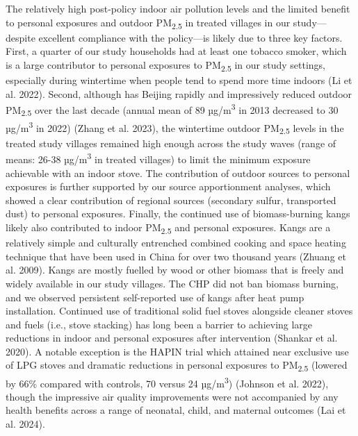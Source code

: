 \documentclass[
  letterpaper,
  DIV=11,
  numbers=noendperiod]{scrartcl}
\begin{document}
The relatively high post-policy indoor air pollution levels and the
limited benefit to personal exposures and outdoor PM\textsubscript{2.5}
in treated villages in our study---despite excellent compliance with the
policy---is likely due to three key factors. First, a quarter of our
study households had at least one tobacco smoker, which is a large
contributor to personal exposures to PM\textsubscript{2.5} in our study
settings, especially during wintertime when people tend to spend more
time indoors (Li et al. 2022). Second, although has Beijing rapidly and
impressively reduced outdoor PM\textsubscript{2.5} over the last decade
(annual mean of 89 µg/m\textsuperscript{3} in 2013 decreased to 30
µg/m\textsuperscript{3} in 2022) (Zhang et al. 2023), the wintertime
outdoor PM\textsubscript{2.5} levels in the treated study villages
remained high enough across the study waves (range of means: 26-38
µg/m\textsuperscript{3} in treated villages) to limit the minimum
exposure achievable with an indoor stove. The contribution of outdoor
sources to personal exposures is further supported by our source
apportionment analyses, which showed a clear contribution of regional
sources (secondary sulfur, transported dust) to personal exposures.
Finally, the continued use of biomass-burning kangs likely also
contributed to indoor PM\textsubscript{2.5} and personal exposures.
Kangs are a relatively simple and culturally entrenched combined cooking
and space heating technique that have been used in China for over two
thousand years (Zhuang et al. 2009). Kangs are mostly fuelled by wood or
other biomass that is freely and widely available in our study villages.
The CHP did not ban biomass burning, and we observed persistent
self-reported use of kangs after heat pump installation. Continued use
of traditional solid fuel stoves alongside cleaner stoves and fuels
(i.e., stove stacking) has long been a barrier to achieving large
reductions in indoor and personal exposures after intervention (Shankar
et al. 2020). A notable exception is the HAPIN trial which attained near
exclusive use of LPG stoves and dramatic reductions in personal
exposures to PM\textsubscript{2.5} (lowered by 66\% compared with
controls, 70 versus 24 µg/m\textsuperscript{3}) (Johnson et al. 2022),
though the impressive air quality improvements were not accompanied by
any health benefits across a range of neonatal, child, and maternal
outcomes (Lai et al. 2024).
\end{document}
